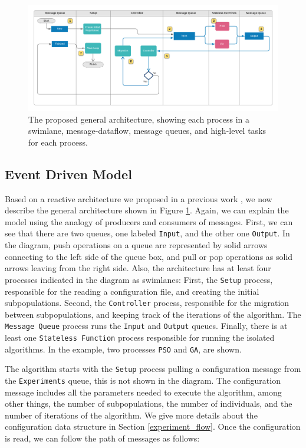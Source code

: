 \documentclass[review]{elsarticle}
\begin{document}
\begin{figure}
    \centering
    \includegraphics[width=\textwidth]{KafkEOsmall}
    \caption{The proposed general architecture, 
     showing each process in a swimlane, message-dataflow,
     message queues, and high-level tasks for each process.} 
    \label{fig:kafkEO}
\end{figure}

\subsection{Event Driven Model} 
\label{edm}
Based on a reactive architecture we proposed in a previous work
\cite{guervos2018introducing}, we now describe the general architecture shown in
Figure \ref{fig:kafkEO}. Again, we can explain the model using the analogy
of producers and consumers of messages. First, we can see that
there are two queues, one labeled \texttt{Input}, and the other one \texttt{Output}. In the diagram, 
push operations on a queue are represented by solid arrows connecting to the left side
of the queue box, and pull or pop operations as solid arrows leaving from the right side.
Also, the architecture has at least four processes indicated in the diagram as
swimlanes: First, the \texttt{Setup} process, responsible for the reading a configuration
file, and creating the initial subpopulations. Second, the \texttt{Controller} process,
responsible for the migration between subpopulations, and keeping track of the
iterations of the algorithm. The \texttt{Message Queue} process runs the \texttt{Input} and \texttt{Output}
queues. Finally, there is at least one \texttt{Stateless Function} process responsible
for running the isolated algorithms. In the example, two processes \texttt{PSO} and \texttt{GA},
are shown. 

The algorithm starts with the \texttt{Setup} process pulling a configuration message from
the \texttt{Experiments} queue, this is not shown in the diagram. The configuration message 
includes all the parameters needed to execute the algorithm, among other things,
the number of subpopulations, the number of individuals, and the number of iterations
of the algorithm. We give more details about the configuration data structure
in Section \ref{experiment_flow}. %
Once the configuration is read, we can follow the path of 
messages as follows:
\end{document}
